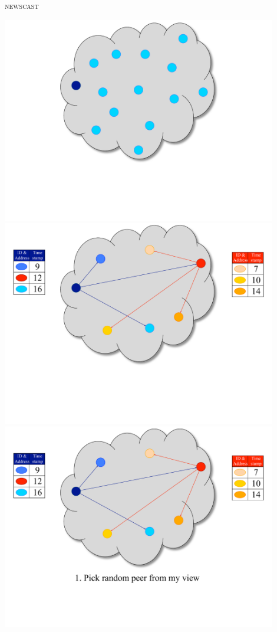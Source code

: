 \begin{frame}{\textsc{newscast}}
	
\begin{overprint}
\includegraphics[width=0.9\textwidth]{figs/11/1_newscast}
\includegraphics[width=0.9\textwidth]{figs/11/2_newscast}
\includegraphics[width=0.9\textwidth]{figs/11/3_newscast}

\end{overprint}
\end{frame}
